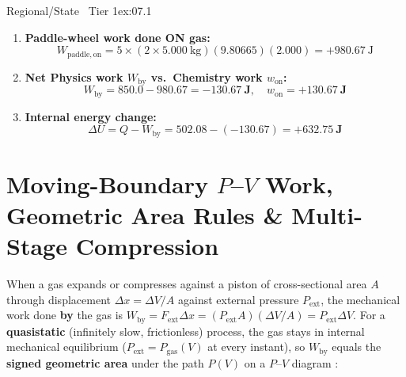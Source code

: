 \begin{twocol}[0.49]
\begin{workedexample}{Regional/State \textbar\ Tier 1}{ex:07.1}
\begin{enumerate}
  \item \textbf{Paddle-wheel work done ON gas:}
  \[
    W_{\mathrm{paddle,on}} = 5 \times (2\times \SI{5.000}{\kilogram})(9.80665)(2.000) = +\SI{980.67}{\joule}
  \]
  \item \textbf{Net Physics work $W_{\mathrm{by}}$ vs.\ Chemistry work $w_{\mathrm{on}}$:}
  \[
    W_{\mathrm{by}} = 850.0 - 980.67 = \mathbf{\SI{-130.67}{\joule}}, \quad w_{\mathrm{on}} = \mathbf{+\SI{130.67}{\joule}}
  \]
  \item \textbf{Internal energy change:}
  \[
    \Delta U = Q - W_{\mathrm{by}} = 502.08 - (-130.67) = \mathbf{+\SI{632.75}{\joule}}
  \]
\end{enumerate}
\end{workedexample}
\end{twocol}

\section{Moving-Boundary $P$--$V$ Work, Geometric Area Rules \& Multi-Stage Compression}\label{sec:07.2}

When a gas expands or compresses against a piston of cross-sectional area $A$ through displacement $\Delta x = \Delta V / A$ against external pressure $P_{\mathrm{ext}}$, the mechanical work done \textbf{by} the gas is $W_{\mathrm{by}} = F_{\mathrm{ext}}\Delta x = (P_{\mathrm{ext}}A)(\Delta V/A) = P_{\mathrm{ext}}\Delta V$. For a \textbf{quasistatic} (infinitely slow, frictionless) process, the gas stays in internal mechanical equilibrium ($P_{\mathrm{ext}} = P_{\mathrm{gas}}(V)$ at every instant), so $W_{\mathrm{by}}$ equals the \textbf{signed geometric area} under the path $P(V)$ on a $P$--$V$ diagram :

